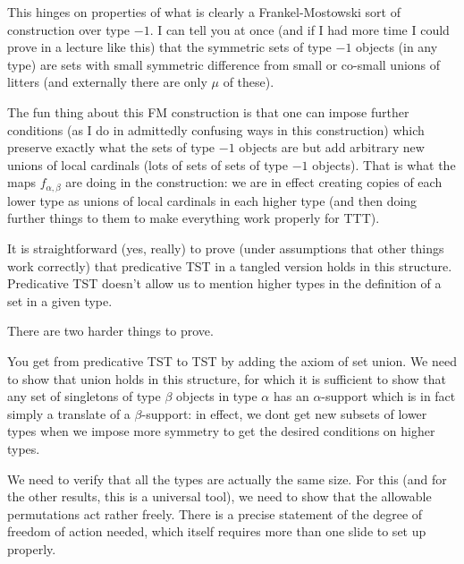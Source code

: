 \documentclass{slides}
\begin{document}
\begin{slide}

This hinges on properties of what is clearly a Frankel-Mostowski sort of construction over type $-1$.  I can tell you at once (and if I had more time I could prove in a lecture like this) that the symmetric sets of type $-1$ objects (in any type) are
sets with small symmetric difference from small or co-small unions of litters (and externally there are only $\mu$ of these).

The fun thing about this FM construction is that one can impose further conditions (as I do in admittedly confusing ways in this construction) which preserve exactly what the sets of type $-1$ objects are but add arbitrary new unions of local cardinals (lots of sets of sets of type $-1$ objects).
That is what the maps $f_{\alpha,\beta}$ are doing in the construction:  we are in effect creating copies of each lower type
as unions of local cardinals in each higher type (and then doing further things to them to make everything work properly for TTT).

It is straightforward (yes, really) to prove (under assumptions that other things work correctly) that predicative TST in a tangled version holds in this structure.  Predicative TST doesn't allow us to mention higher types in the definition of a set in a given type.

There are two harder things to prove.

You get from predicative TST to TST by adding the axiom of set union.  We need to show that union holds in this structure, for which it is sufficient to show that any set of singletons of type $\beta$ objects in type $\alpha$ has an $\alpha$-support which is in fact simply a translate of a $\beta$-support:  in effect, we dont get new subsets of lower types when we impose more symmetry to get the desired conditions on higher types.

We need to verify that all the types are actually the same size.  For this (and for the other results, this is a universal tool), we need to show that the allowable permutations act rather freely.  There is a precise statement of the degree of freedom of action needed, which itself requires more than one slide to set up properly.

\end{slide}
\end{document}
